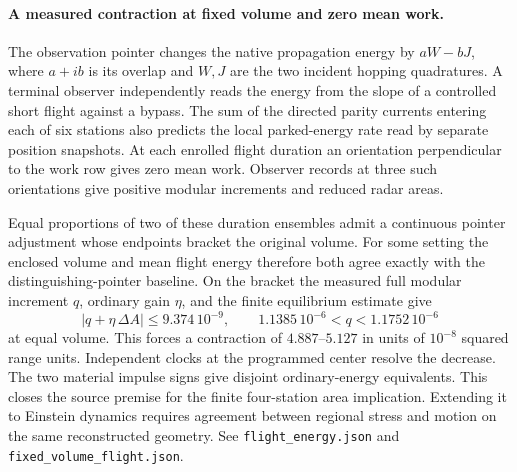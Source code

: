 \documentclass[11pt]{article}
\begin{document}
\paragraph{A measured contraction at fixed volume and zero mean work.}
The observation pointer changes the native propagation energy by
\(aW-bJ\), where \(a+ib\) is its overlap and \(W,J\) are the two
incident hopping quadratures. A terminal observer independently reads
the energy from the slope of a controlled short flight against a bypass.
The sum of the directed parity currents entering each of six stations
also predicts the local parked-energy rate read by separate position
snapshots. At each enrolled flight duration an orientation perpendicular
to the work row gives zero mean work. Observer records at three such
orientations give positive modular increments and reduced radar areas.

Equal proportions of two of these duration ensembles admit a continuous
pointer adjustment whose endpoints bracket the original volume. For
some setting the enclosed volume and mean flight energy therefore both
agree exactly with the distinguishing-pointer baseline. On the bracket
the measured full modular increment \(q\), ordinary gain \(\eta\), and
the finite equilibrium estimate give
\[
  |q+\eta\,\Delta A|\leq 9.374\,10^{-9},\qquad
  1.1385\,10^{-6} < q < 1.1752\,10^{-6}
\]
at equal volume. This forces a contraction of \(4.887\)--\(5.127\)
in units of \(10^{-8}\) squared range units. Independent clocks at the
programmed center resolve the decrease. The two material impulse signs
give disjoint ordinary-energy equivalents. This closes the source
premise for the finite four-station area implication. Extending it
to Einstein dynamics requires agreement between regional stress and
motion on the same reconstructed geometry.
See \texttt{flight\_energy.json} and \texttt{fixed\_volume\_flight.json}.
\end{document}
